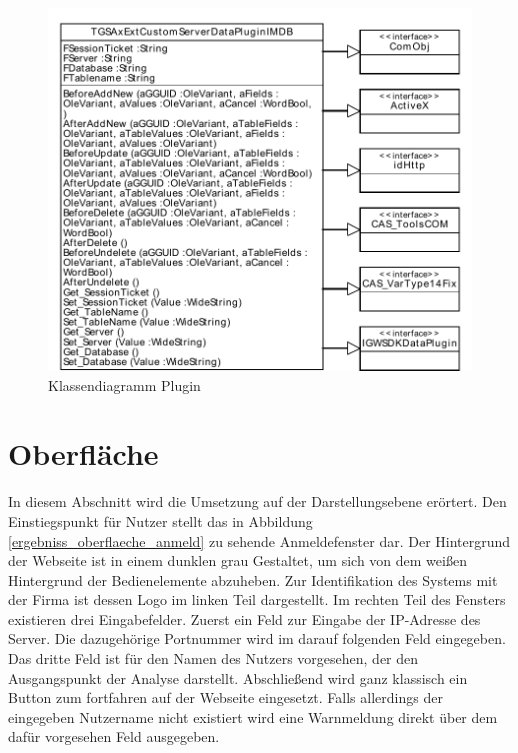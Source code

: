 \begin{figure}[htbp]
\centering
\includegraphics[scale=0.8]{pics/plugin_klassendiagramm.pdf}
\caption{Klassendiagramm Plugin}
\label{ergebniss_plugin_klassendiagramm}
\end{figure}

\section{Oberfläche}

In diesem Abschnitt wird die Umsetzung auf der Darstellungsebene erörtert. Den Einstiegspunkt für Nutzer stellt das in Abbildung \ref{ergebniss_oberflaeche_anmeld} zu sehende Anmeldefenster dar. Der Hintergrund der Webseite ist in einem dunklen grau Gestaltet, um sich von dem weißen Hintergrund der Bedienelemente abzuheben. Zur Identifikation des Systems mit der Firma ist dessen Logo im linken Teil dargestellt. Im rechten Teil des Fensters existieren drei Eingabefelder. Zuerst ein Feld zur Eingabe der IP-Adresse des Server. Die dazugehörige Portnummer wird im darauf folgenden Feld eingegeben. Das dritte Feld ist für den Namen des Nutzers vorgesehen, der den Ausgangspunkt der Analyse darstellt. Abschließend wird ganz klassisch ein Button zum fortfahren auf der Webseite eingesetzt. Falls allerdings der eingegeben Nutzername nicht existiert wird eine Warnmeldung direkt über dem dafür vorgesehen Feld ausgegeben. 

